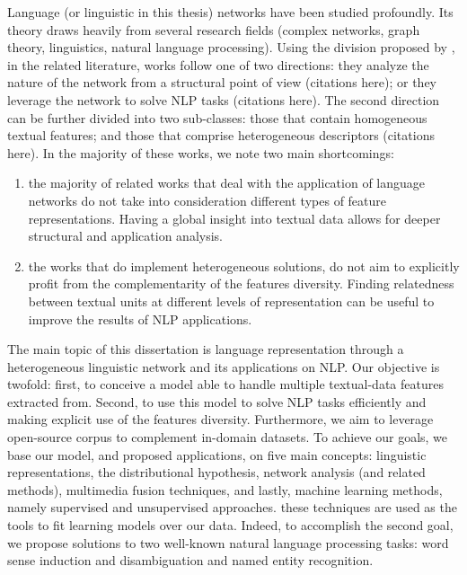 Language (or linguistic in this thesis) networks  have been studied profoundly. Its theory draws heavily from several research fields (complex networks, graph theory, linguistics, natural language processing). Using the division proposed by \cite{Choudhury09}, in the related literature, works follow one of two directions: they analyze the nature of the network from a structural point of view (citations here); or they leverage the network to solve NLP tasks (citations here). The second direction can be further divided into two sub-classes: those that contain homogeneous textual features; and those that comprise heterogeneous descriptors (citations here). In the majority of these works, we note two main shortcomings:
\begin{enumerate}
\item the majority of related works that deal with the application of language networks do not take into consideration different types of feature representations. Having a global insight into textual data allows for deeper structural and application analysis.
\item the works that do implement heterogeneous solutions, do not aim to explicitly profit from the complementarity of the features diversity. Finding relatedness between textual units at different levels of representation can be useful to improve the results of NLP applications.

\end{enumerate}
 

The main topic of this dissertation is language representation through a heterogeneous linguistic network and its applications on NLP. Our objective is twofold: first, to conceive a model able to handle multiple textual-data features extracted from. Second, to use this model to solve NLP tasks efficiently and making explicit use of the features diversity. Furthermore, we aim to leverage open-source corpus to complement in-domain datasets.  To achieve our goals, we base our model, and proposed applications, on five main concepts: linguistic representations, the distributional hypothesis, network analysis (and related methods),  multimedia fusion techniques, and lastly,  machine learning methods, namely supervised and unsupervised approaches. these techniques are used as the tools to fit learning models over our data. Indeed, to accomplish the second goal,  we propose solutions to two well-known natural language processing tasks: word sense induction and disambiguation and named entity recognition. 

